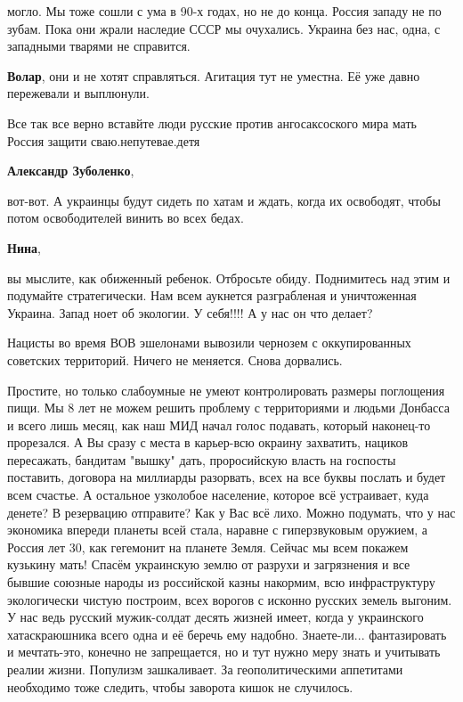 \begin{itemize}
\begin{itemize}
могло. Мы тоже сошли с ума в 90-х годах, но не до конца. Россия западу не по
зубам. Пока они жрали наследие СССР мы очухались. Украина без нас, одна, с
западными тварями не справится.

\textbf{Волар}, они и не хотят справляться. Агитация тут не уместна. Её уже давно пережевали и выплюнули.
\end{itemize} %


Все так все верно вставйте люди русские против ангосаксоского мира мать Россия
защити сваю.непутевае.детя

\begin{itemize} %
\textbf{Александр Зуболенко}, 

вот-вот. А украинцы будут сидеть по хатам и ждать, когда их освободят, чтобы
потом освободителей винить во всех бедах.

\textbf{Нина}, 

вы мыслите, как обиженный ребенок. Отбросьте обиду. Поднимитесь над этим и
подумайте стратегически. Нам всем аукнется разграбленая и уничтоженная Украина.
Запад ноет об экологии. У себя!!!! А у нас он что делает?

\end{itemize} %


Нацисты во время ВОВ эшелонами вывозили чернозем с оккупированных советских
территорий. Ничего не меняется. Снова дорвались.


Простите, но только слабоумные не умеют контролировать размеры поглощения
пищи. Мы 8 лет не можем решить проблему с территориями и людьми Донбасса и всего
лишь месяц, как наш МИД начал голос подавать, который наконец-то прорезался. А Вы
сразу с места в карьер-всю окраину захватить, нациков пересажать, бандитам
"вышку" дать, проросийскую власть на госпосты поставить, договора на миллиарды
разорвать, всех на все буквы послать и будет всем счастье. А остальное узколобое
население, которое всё устраивает, куда денете? В резервацию отправите? Как у Вас
всё лихо. Можно подумать, что у нас экономика впереди планеты всей стала, наравне
с гиперзвуковым оружием, а Россия лет 30, как гегемонит на планете Земля. Сейчас
мы всем покажем кузькину мать! Спасём украинскую землю от разрухи и загрязнения
и все бывшие союзные народы из российской казны накормим, всю инфраструктуру
экологически чистую построим, всех ворогов с исконно русских земель выгоним. У
нас ведь русский мужик-солдат десять жизней имеет, когда у украинского
хатаскраюшника всего одна и её беречь ему надобно. Знаете-ли... фантазировать и
мечтать-это, конечно не запрещается, но и тут нужно меру знать и учитывать реалии
жизни. Популизм зашкаливает. За геополитическими аппетитами необходимо тоже
следить, чтобы заворота кишок не случилось.


\end{itemize}
